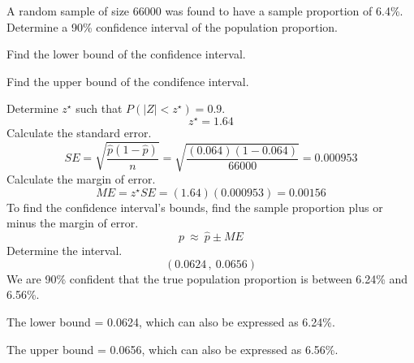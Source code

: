 
\begin{question}
A random sample of size 66000 was found to have a sample proportion of
6.4\%. Determine a 90\% confidence interval of the population
proportion.
\begin{answerlist}
  \item Find the lower bound of the confidence interval.
  \item Find the upper bound of the condifence interval.
\end{answerlist}
\end{question}

\begin{solution}
Determine \(z^\star\) such that \(P(|Z|<z^\star) = 0.9\).
\[z^\star = 1.64 \] Calculate the standard error.
\[SE = \sqrt{\frac{\hat{p}(1-\hat{p})}{n}} = \sqrt{\frac{(0.064)(1-0.064)}{66000}} = 0.000953 \]
Calculate the margin of error.
\[ME = z^\star SE = (1.64)(0.000953) = 0.00156 \] To find the confidence
interval's bounds, find the sample proportion plus or minus the margin
of error. \[p ~\approx~ \hat{p} \pm ME \] Determine the interval.
\[(0.0624\,,~ 0.0656) \] We are 90\% confident that the true population
proportion is between 6.24\% and 6.56\%.
\begin{answerlist}
  \item The lower bound = 0.0624, which can also be expressed as 6.24\%.
  \item The upper bound = 0.0656, which can also be expressed as 6.56\%.
\end{answerlist}
\end{solution}

